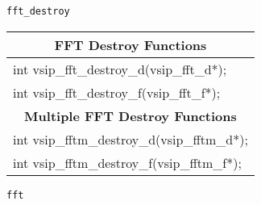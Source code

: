 \clearpage
\hspace*{.8cm} \vspace*{.1cm} \texttt{fft\_destroy}
\newline \hspace*{1.1cm} {
\ttfamily
\begin{tabular}[H]{l}\hline
\hline \multicolumn{1}{c}{\rmfamily \bfseries FFT Destroy Functions}\\ \hline
int vsip\_fft\_destroy\_d(vsip\_fft\_d*);\\
int vsip\_fft\_destroy\_f(vsip\_fft\_f*);\\
\hline \multicolumn{1}{c}{\rmfamily \bfseries Multiple FFT Destroy Functions}\\ \hline
int vsip\_fftm\_destroy\_d(vsip\_fftm\_d*);\\
int vsip\_fftm\_destroy\_f(vsip\_fftm\_f*);\\ \hline
\end{tabular}
}\vspace{.1cm}
\newline \hspace*{.8cm} \vspace*{.1cm} \texttt{fft}
